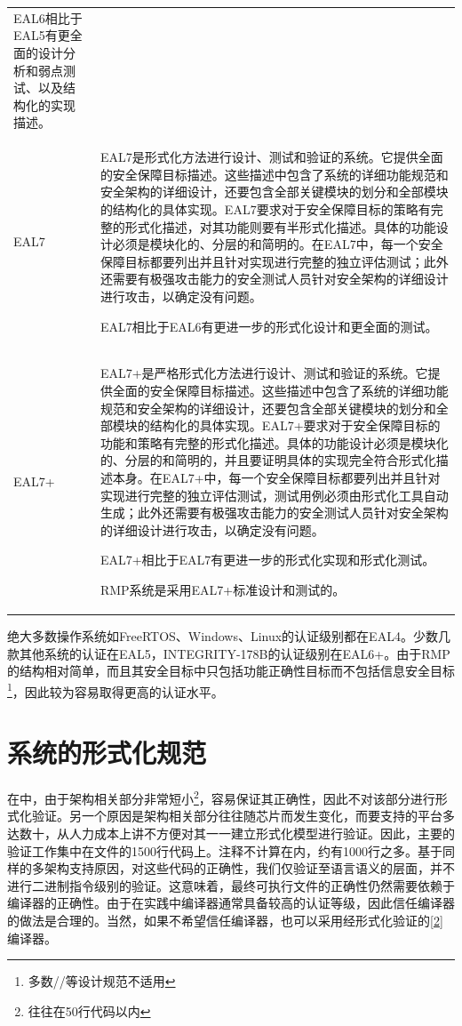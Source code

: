 {\begin{longtable}[]{@{}
  >{\raggedright\arraybackslash}p{}
  >{\raggedright\arraybackslash}p{}@{}}
EAL6相比于EAL5有更全面的设计分析和弱点测试、以及结构化的实现描述。 \\
EAL7 &
EAL7是形式化方法进行设计、测试和验证的系统。它提供全面的安全保障目标描述。这些描述中包含了系统的详细功能规范和安全架构的详细设计，还要包含全部关键模块的划分和全部模块的结构化的具体实现。EAL7要求对于安全保障目标的策略有完整的形式化描述，对其功能则要有半形式化描述。具体的功能设计必须是模块化的、分层的和简明的。在EAL7中，每一个安全保障目标都要列出并且针对实现进行完整的独立评估测试；此外还需要有极强攻击能力的安全测试人员针对安全架构的详细设计进行攻击，以确定没有问题。

EAL7相比于EAL6有更进一步的形式化设计和更全面的测试。 \\
EAL7+ &
EAL7+是严格形式化方法进行设计、测试和验证的系统。它提供全面的安全保障目标描述。这些描述中包含了系统的详细功能规范和安全架构的详细设计，还要包含全部关键模块的划分和全部模块的结构化的具体实现。EAL7+要求对于安全保障目标的功能和策略有完整的形式化描述。具体的功能设计必须是模块化的、分层的和简明的，并且要证明具体的实现完全符合形式化描述本身。在EAL7+中，每一个安全保障目标都要列出并且针对实现进行完整的独立评估测试，测试用例必须由形式化工具自动生成；此外还需要有极强攻击能力的安全测试人员针对安全架构的详细设计进行攻击，以确定没有问题。

EAL7+相比于EAL7有更进一步的形式化实现和形式化测试。

RMP系统是采用EAL7+标准设计和测试的。 \\
\end{longtable}
}

绝大多数操作系统如FreeRTOS、Windows、Linux的认证级别都在EAL4。少数几款其他系统的认证在EAL5，INTEGRITY-178B的认证级别在EAL6+。由于RMP的结构相对简单，而且其安全目标中只包括功能正确性目标而不包括信息安全目标\footnote{多数//等设计规范不适用}，因此较为容易取得更高的认证水平。

\section{系统的形式化规范}\label{sec:formal-specification-of-the-system}

在中，由于架构相关部分非常短小\footnote{往往在50行代码以内}，容易保证其正确性，因此不对该部分进行形式化验证。另一个原因是架构相关部分往往随芯片而发生变化，而要支持的平台多达数十，从人力成本上讲不方便对其一一建立形式化模型进行验证。因此，主要的验证工作集中在文件的1500行代码上。注释不计算在内，约有1000行之多。基于同样的多架构支持原因，对这些代码的正确性，我们仅验证至语言语义的层面，并不进行二进制指令级别的验证。这意味着，最终可执行文件的正确性仍然需要依赖于编译器的正确性。由于在实践中编译器通常具备较高的认证等级，因此信任编译器的做法是合理的。当然，如果不希望信任编译器，也可以采用经形式化验证的\hyperref[sec:chapter-bibliography-8]{{[}2{]}}编译器。

